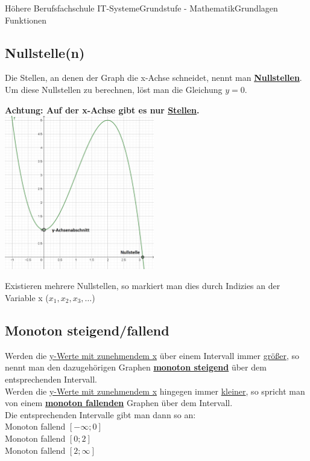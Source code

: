 \documentclass[11pt,twocolumn,oneside,openany,headings=optiontotoc,11pt,numbers=noenddot]{article}
\begin{document}
\begin{worksheet}{Höhere Berufsfachschule IT-Systeme}{Grundstufe - Mathematik}{Grundlagen Funktionen}
		\subsection*{Nullstelle(n)}
		Die Stellen, an denen der Graph die x-Achse schneidet, nennt man \textbf{\underline{Nullstellen}}. Um diese Nullstellen zu berechnen, löst man die Gleichung \(y = 0\).\\
		\par\bigskip\noindent
		\textbf{Achtung: Auf der x-Achse gibt es nur \underline{Stellen}.}\\
		\includegraphics[width=0.49\textwidth]{../99_Bilder/nyAA.png}\\
		\par\bigskip\noindent
		Existieren mehrere Nullstellen, so markiert man dies durch Indizies an der Variable x (\(x_1, x_2, x_3, \ldots\))
		\subsection*{Monoton steigend/fallend}
		Werden die \underline{y-Werte mit zunehmendem x} über einem Intervall immer \underline{größer}, so nennt man den dazugehörigen Graphen \textbf{\underline{monoton steigend}} über dem entsprechenden Intervall.\\
		Werden die \underline{y-Werte mit zunehmendem x} hingegen immer \underline{kleiner}, so spricht man von einem \textbf{\underline{monoton fallenden}} Graphen über dem Intervall.\\
		Die entsprechenden Intervalle gibt man dann so an:\\
		Monoton fallend \(\left[-\infty;0\right]\)\\
		Monoton fallend \(\left[0;2\right]\)\\
		Monoton fallend \(\left[2;\infty\right]\)

\end{worksheet}
\end{document}
